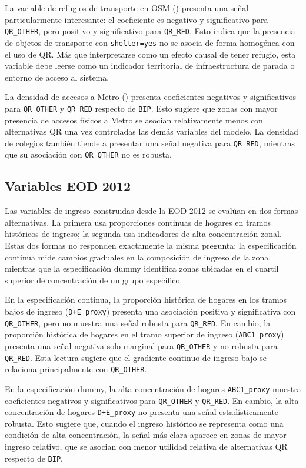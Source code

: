 La variable de refugios de transporte en OSM
() presenta una señal particularmente interesante:
el coeficiente es negativo y significativo para \texttt{QR\_OTHER}, pero positivo y significativo
para \texttt{QR\_RED}. Esto indica que la presencia de objetos de transporte con
\texttt{shelter=yes} no se asocia de forma homogénea con el uso de QR. Más que interpretarse como un
efecto causal de tener refugio, esta variable debe leerse como un indicador territorial de
infraestructura de parada o entorno de acceso al sistema.

La densidad de accesos a Metro
() presenta coeficientes negativos y significativos
para \texttt{QR\_OTHER} y \texttt{QR\_RED} respecto de \texttt{BIP}. Esto sugiere que zonas con
mayor presencia de accesos físicos a Metro se asocian relativamente menos con alternativas QR una vez
controladas las demás variables del modelo. La densidad de colegios también tiende a presentar una
señal negativa para \texttt{QR\_RED}, mientras que su asociación con \texttt{QR\_OTHER} no es
robusta.

\subsection{Variables EOD 2012}

Las variables de ingreso construidas desde la EOD 2012 se evalúan en dos formas alternativas. La
primera usa proporciones continuas de hogares en tramos históricos de ingreso; la segunda usa
indicadores de alta concentración zonal. Estas dos formas no responden exactamente la misma pregunta:
la especificación continua mide cambios graduales en la composición de ingreso de la zona, mientras
que la especificación dummy identifica zonas ubicadas en el cuartil superior de concentración de un
grupo específico.

En la especificación continua, la proporción histórica de hogares en los tramos bajos de ingreso
(\texttt{D+E\_proxy}) presenta una asociación positiva y significativa con \texttt{QR\_OTHER}, pero
no muestra una señal robusta para \texttt{QR\_RED}. En cambio, la proporción histórica de hogares en
el tramo superior de ingreso (\texttt{ABC1\_proxy}) presenta una señal negativa solo marginal para
\texttt{QR\_OTHER} y no robusta para \texttt{QR\_RED}. Esta lectura sugiere que el gradiente
continuo de ingreso bajo se relaciona principalmente con \texttt{QR\_OTHER}.

En la especificación dummy, la alta concentración de hogares \texttt{ABC1\_proxy} muestra
coeficientes negativos y significativos para \texttt{QR\_OTHER} y \texttt{QR\_RED}. En cambio, la
alta concentración de hogares \texttt{D+E\_proxy} no presenta una señal estadísticamente robusta.
Esto sugiere que, cuando el ingreso histórico se representa como una condición de alta concentración,
la señal más clara aparece en zonas de mayor ingreso relativo, que se asocian con menor utilidad
relativa de alternativas QR respecto de \texttt{BIP}.

